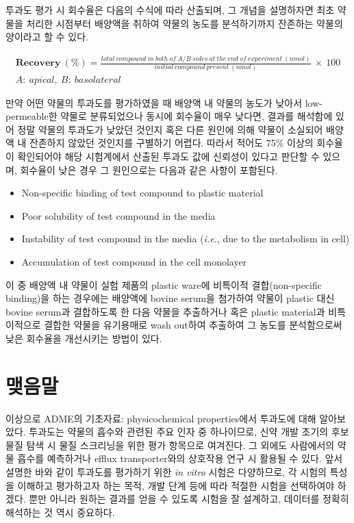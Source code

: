 \documentclass[
  11pt,
  krantz2, a4paper, twoside]{krantz}
\providecommand{\tightlist}{%
  \setlength{\itemsep}{0pt}\setlength{\parskip}{0pt}}
\begin{document}
투과도 평가 시 회수율은 다음의 수식에 따라 산출되며, 그 개념을 설명하자면 최초 약물을 처리한 시점부터 배양액을 취하여 약물의 농도를 분석하기까지 잔존하는 약물의 양이라고 할 수 있다.

\begin{equation}
\begin{split}
\mathbf{Recovery\ }\left( \mathbf{\%} \right) = \frac{total\ compound\ in\ both\ of\ A/B\ sides\ at\ the\ end\ of\ experiment\ (nmol)}{initial\ compound\ present\ (nmol)}\  \times \ 100 \\
A:\ apical,\ B:\ basolateral
\end{split}
\label{eq:eq02-03}
\end{equation}

만약 어떤 약물의 투과도를 평가하였을 때 배양액 내 약물의 농도가 낮아서 low-permeable한 약물로 분류되었으나 동시에 회수율이 매우 낮다면, 결과를 해석함에 있어 정말 약물의 투과도가 낮았던 것인지 혹은 다른 원인에 의해 약물이 소실되어 배양액 내 잔존하지 않았던 것인지를 구별하기 어렵다.
따라서 적어도 75\% 이상의 회수율이 확인되어야 해당 시험계에서 산출된 투과도 값에 신뢰성이 있다고 판단할 수 있으며, 회수율이 낮은 경우 그 원인으로는 다음과 같은 사항이 포함된다.

\begin{itemize}
\tightlist
\item
  Non-specific binding of test compound to plastic material
\item
  Poor solubility of test compound in the media
\item
  Instability of test compound in the media (\emph{i.e.}, due to the metabolism in cell)
\item
  Accumulation of test compound in the cell monolayer
\end{itemize}

이 중 배양액 내 약물이 실험 제품의 plastic ware에 비특이적 결합(non-specific binding)을 하는 경우에는 배양액에 bovine serum을 첨가하여 약물이 plastic 대신 bovine serum과 결합하도록 한 다음 약물을 추출하거나 혹은 plastic material과 비특이적으로 결합한 약물을 유기용매로 wash out하여 추출하여 그 농도를 분석함으로써 낮은 회수율을 개선시키는 방법이 있다.

\hypertarget{uxb9fauxc74cuxb9d0-1}{%
\section{맺음말}\label{uxb9fauxc74cuxb9d0-1}}

이상으로 ADME의 기초자료: physicochemical properties에서 투과도에 대해 알아보았다.
투과도는 약물의 흡수와 관련된 주요 인자 중 하나이므로, 신약 개발 초기의 후보물질 탐색 시 물질 스크리닝을 위한 평가 항목으로 여겨진다.
그 외에도 사람에서의 약물 흡수를 예측하거나 efflux transporter와의 상호작용 연구 시 활용될 수 있다.
앞서 설명한 바와 같이 투과도를 평가하기 위한 \emph{in vitro} 시험은 다양하므로, 각 시험의 특성을 이해하고 평가하고자 하는 목적, 개발 단계 등에 따라 적절한 시험을 선택하여야 하겠다.
뿐만 아니라 원하는 결과를 얻을 수 있도록 시험을 잘 설계하고, 데이터를 정확히 해석하는 것 역시 중요하다.
\end{document}
